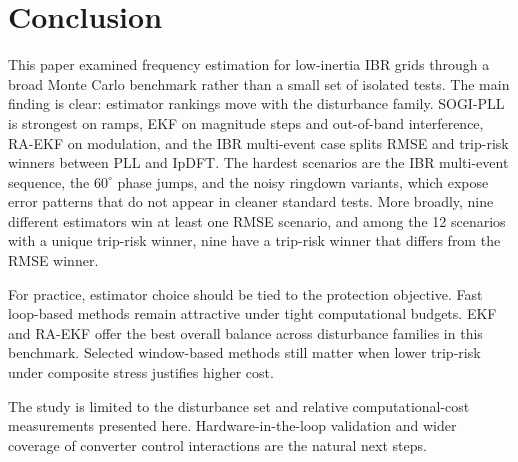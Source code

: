 ﻿\section{Conclusion}
\label{sec:conclusion}

This paper examined frequency estimation for low-inertia IBR grids through a
broad Monte Carlo benchmark rather than a small set of isolated tests. The
main finding is clear: estimator rankings move with the disturbance family.
SOGI-PLL is strongest on ramps, EKF on magnitude steps and out-of-band
interference, RA-EKF on modulation, and the IBR multi-event case splits RMSE
and trip-risk winners between PLL and IpDFT. The hardest scenarios are the IBR
multi-event sequence, the $60^\circ$ phase jumps, and the noisy ringdown
variants, which expose error patterns that do not appear in cleaner standard
tests. More broadly, nine different estimators win at least one RMSE scenario,
and among the 12 scenarios with a unique trip-risk winner, nine have a trip-risk
winner that differs from the RMSE winner.

For practice, estimator choice should be tied to the protection objective.
Fast loop-based methods remain attractive under tight computational budgets. EKF and
RA-EKF offer the best overall balance across disturbance families in this
benchmark. Selected window-based methods still matter when lower trip-risk
under composite stress justifies higher cost.

The study is limited to the disturbance set and relative computational-cost
measurements presented here. Hardware-in-the-loop validation and wider
coverage of converter control interactions are the natural next steps.


